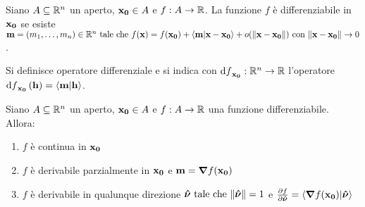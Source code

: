 \begin{definition}
    Siano $A \subseteq \mathbb{R}^n$ un aperto, $\vb{x_0} \in A$ e $f:A \to \mathbb{R}$. La funzione $f$ è differenziabile in $\vb{x_0}$ se esiste $\vb{m} = (m_1,\dots,m_n) \in \R^n \tc f(\vb{x}) = f(\vb{x_0}) + \ip{\vb{m}}{\vb{x} - \vb{x_0}} + o(\norm{\vb{x} - \vb{x_0}}) \with \norm{\vb{x}-\vb{x_0}}\to 0$.
\end{definition}

\begin{definition}
    Si definisce operatore differenziale e si indica con $\dd{f}_{\vb{x_0}} : \mathbb{R}^n \to \mathbb{R}$ l'operatore $\dd{f}_{\vb{x_0}}(\vb{h})=\ip{\vb{m}}{\vb{h}}$.
\end{definition}

\begin{theorem}
    \label{thm:prop_diff}
    Siano $A \subseteq \mathbb{R}^n$ un aperto, $\vb{x_0} \in A$ e $f:A \to \mathbb{R}$ una funzione differenziabile. Allora:
    \begin{enumerate}
        \item $f$ è continua in $\vb{x_0}$
        \item $f$ è derivabile parzialmente in $\vb{x_0}$ e $\vb{m} = \bm{\nabla}f(\vb{x_0})$
        \item $f$ è derivabile in qualunque direzione $\bm{\hat{\nu}} \text{ tale che } \norm{\bm{\hat{\nu}}}=1$ e $\frac{\partial f}{\partial \bm{\hat{\nu}}} = \ip{\grad f(\vb{x_0})}{\bm{\hat{\nu}}}$
    \end{enumerate}
\end{theorem}

